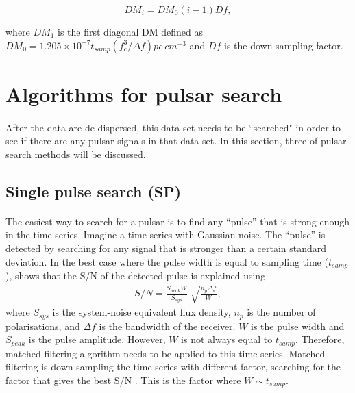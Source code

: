 \documentclass[thesis_msc.tex]{subfiles}
\begin{document}
                \begin{equation} \label{dm_step_dig}
        DM_i=DM_{0}(i-1) Df,
        \end{equation}        
         
 where $DM_{1}$ is the first diagonal DM defined as $DM_0 = 1.205\times10^{-7} t_{samp}(f_c^3/\Delta f)pc~cm^{-3}$  and $Df$ is the down sampling factor. 

        
    \section{Algorithms for pulsar search}
    \paragraph{} After the data are de-dispersed, this data set needs to be ``searched" in order to see if there are any pulsar signals in that data set. In this section, three of pulsar search methods will be discussed.   
        	\subsection{Single pulse search (SP)} \label{SP}
        \paragraph{} The easiest way to search for a pulsar is to find any ``pulse'' that is strong enough in the time series. Imagine a time series with Gaussian noise. The ``pulse'' is detected by searching for any signal that is stronger than a certain standard deviation. In the best case where the pulse width is equal to sampling time ($t_{samp}$), \cite{cordes2003searches} shows that the S/N of the detected pulse is explained using
\begin{eqnarray}
S/N=\frac{S_{peak} W}{S_{sys}}\sqrt[]{\frac{n_p \Delta f}{W}},
\end{eqnarray}
where $S_{sys}$ is the system-noise equivalent flux density, $n_p$ is the number of polarisations, and $\Delta f$ is the bandwidth of the receiver. $W$ is the pulse width and $S_{peak}$ is the pulse amplitude. However, $W$ is not always equal to $t_{samp}$. Therefore, matched filtering algorithm needs to be applied to this time series. Matched filtering is down sampling the time series with different factor, searching for the factor that gives the best S/N . This is the factor where $W \sim t_{samp}$.

\end{document}
